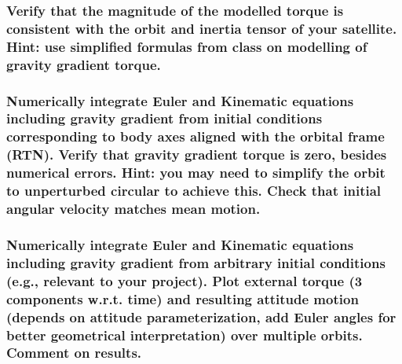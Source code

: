 \subsubsection{Verify that the magnitude of the modelled torque is consistent with the orbit and inertia tensor of
your satellite. Hint: use simplified formulas from class on modelling of gravity gradient torque.}

\subsubsection{Numerically integrate Euler and Kinematic equations including gravity gradient from initial
conditions corresponding to body axes aligned with the orbital frame (RTN). Verify that gravity
gradient torque is zero, besides numerical errors. Hint: you may need to simplify the orbit to
unperturbed circular to achieve this. Check that initial angular velocity matches mean motion.}

\subsubsection{Numerically integrate Euler and Kinematic equations including gravity gradient from arbitrary
initial conditions (e.g., relevant to your project). Plot external torque (3 components w.r.t. time)
and resulting attitude motion (depends on attitude parameterization, add Euler angles for better
geometrical interpretation) over multiple orbits. Comment on results.}


